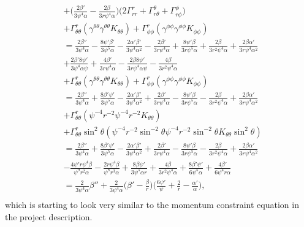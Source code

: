 \documentclass[12pt]{article}
\numberwithin{equation}{section}
\begin{document}
\begin{equation}
\begin{aligned}
&+ \Big( \frac{2 \beta'}{3 \psi^{4} \alpha} - \frac{2 \beta}{3 r \psi^{4} \alpha} \Big) \Big( 2 \Gamma^{r}_{r r} + \Gamma^{\theta}_{r \theta} + \Gamma^{\phi}_{r \phi} \Big) \\
&+ \Gamma^{r}_{\theta \theta} (\gamma^{\theta \theta} \gamma^{\theta \theta} K_{\theta \theta}) + \Gamma^{r}_{\phi \phi} (\gamma^{\phi \phi} \gamma^{\phi \phi} K_{\phi \phi}) \\
&=  \frac{2 \beta''}{3 \psi^{4} \alpha} - \frac{8 \psi' \beta'}{3 \psi^{5} \alpha} - \frac{2 \alpha' \beta'}{3 \psi^{4} \alpha^2} - \frac{2 \beta'}{3 r \psi^{4} \alpha} + \frac{8 \psi' \beta}{3 r \psi^{5} \alpha} + \frac{2 \beta}{3 r^2 \psi^{4} \alpha} + \frac{2 \beta \alpha'}{3 r \psi^{4} \alpha^2}  \\
&+ \frac{2 \beta' 8 \psi'}{3 \psi^{4} \alpha \psi} + \frac{4 \beta'}{3 r \psi^{4} \alpha} - \frac{2 \beta 8 \psi'}{3 r \psi^{4} \alpha \psi} - \frac{4 \beta}{3 r^2 \psi^{4} \alpha} \\
&+ \Gamma^{r}_{\theta \theta} (\gamma^{\theta \theta} \gamma^{\theta \theta} K_{\theta \theta}) + \Gamma^{r}_{\phi \phi} (\gamma^{\phi \phi} \gamma^{\phi \phi} K_{\phi \phi}) \\
&= \frac{2 \beta''}{3 \psi^{4} \alpha} + \frac{8 \beta' \psi'}{3 \psi^{5} \alpha} - \frac{2 \alpha' \beta'}{3 \psi^{4} \alpha^2} + \frac{2 \beta'}{3 r \psi^{4} \alpha} - \frac{8 \psi' \beta}{3 r \psi^{5} \alpha} - \frac{2 \beta}{3 r^2 \psi^{4} \alpha} + \frac{2 \beta \alpha'}{3 r \psi^{4} \alpha^2} \\
&+ \Gamma^{r}_{\theta \theta} (\psi^{-4} r^{-2} \psi^{-4} r^{-2} K_{\theta \theta}) \\
&+ \Gamma^{r}_{\theta \theta} \sin^{2} \theta (\psi^{-4} r^{-2} \sin^{-2} \theta \psi^{-4} r^{-2} \sin^{-2} \theta K_{\theta \theta} \sin^{2} \theta) \\
&= \frac{2 \beta''}{3 \psi^{4} \alpha} + \frac{8 \beta' \psi'}{3 \psi^{5} \alpha} - \frac{2 \alpha' \beta'}{3 \psi^{4} \alpha^2} + \frac{2 \beta'}{3 r \psi^{4} \alpha} - \frac{8 \psi' \beta}{3 r \psi^{5} \alpha} - \frac{2 \beta}{3 r^2 \psi^{4} \alpha} + \frac{2 \beta \alpha'}{3 r \psi^{4} \alpha^2} \\
&- \frac{4 \psi' r \psi^4 \beta}{\psi^{9} r^{2} \alpha} - \frac{2 r \psi^4 \beta}{\psi^{8} r^{3} \alpha} + \frac{8 \beta \psi'}{3 \psi^{5} \alpha r} + \frac{4 \beta}{3 r^2 \psi^{4} \alpha} + \frac{8 \beta' \psi'}{6 \psi^{5} \alpha} + \frac{4 \beta'}{6 \psi^{4} r \alpha} \\
&= \frac{2}{3 \psi^{4} \alpha} \beta'' + \frac{2}{3 \psi^4 \alpha} \Big( \beta' - \frac{\beta}{r} \Big) \Big( \frac{6 \psi'}{\psi} + \frac{2}{r} - \frac{\alpha'}{\alpha} \Big), \\
\end{aligned}
\end{equation}
which is starting to look very similar to the momentum constraint equation in the project description.
\end{document}
